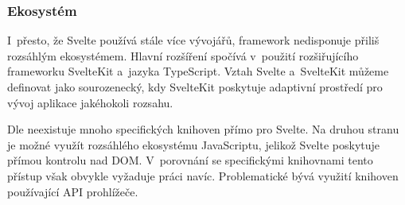 \subsubsection{Ekosystém}

I~přesto, že Svelte používá stále více vývojářů, framework nedisponuje přiliš rozsáhlým ekosystémem. Hlavní rozšíření spočívá v~použití rozšiřujícího frameworku SvelteKit a~jazyka TypeScript. 
Vztah Svelte a~SvelteKit můžeme definovat jako sourozenecký, kdy SvelteKit poskytuje adaptivní prostředí pro vývoj aplikace jakéhokoli rozsahu.

Dle \cite{sveltedailydev} neexistuje mnoho specifických knihoven přímo pro Svelte. 
Na druhou stranu je možné využít rozsáhlého ekosystému JavaScriptu, jelikož Svelte poskytuje přímou kontrolu nad DOM. 
V~porovnání se specifickými knihovnami tento přístup však obvykle vyžaduje práci navíc. 
Problematické bývá využití knihoven používající API prohlížeče.\cite{svelteheyreliable,sveltedailydev,sveltejslibs}
